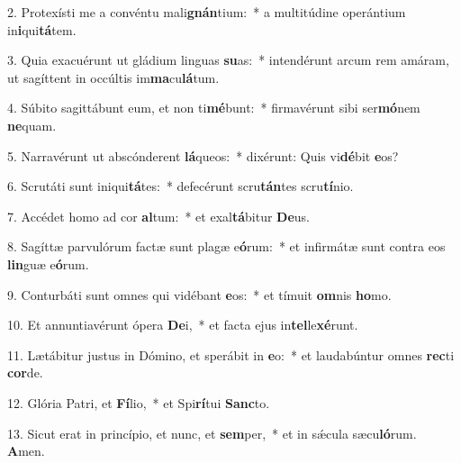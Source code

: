 2. Protexísti me a convéntu mali\textbf{gnán}tium:~*  a multitúdine operántium in\textbf{i}qui\textbf{tá}tem.\

3. Quia exacuérunt ut gládium linguas \textbf{su}as:~*  intendérunt arcum rem amáram, ut sagíttent in occúltis im\textbf{ma}cu\textbf{lá}tum.\

4. Súbito sagittábunt eum, et non ti\textbf{mé}bunt:~*  firmavérunt sibi ser\textbf{mó}nem \textbf{ne}quam.\

5. Narravérunt ut abscónderent \textbf{lá}queos:~*  dixérunt: Quis vi\textbf{dé}bit \textbf{e}os?\

6. Scrutáti sunt iniqui\textbf{tá}tes:~*  defecérunt scru\textbf{tán}tes scru\textbf{tí}nio.\

7. Accédet homo ad cor \textbf{al}tum:~*  et exal\textbf{tá}bitur \textbf{De}us.\

8. Sagíttæ parvulórum factæ sunt plagæ e\textbf{ó}rum:~*  et infirmátæ sunt contra eos \textbf{lin}guæ e\textbf{ó}rum.\

9. Conturbáti sunt omnes qui vidébant \textbf{e}os:~*  et tímuit \textbf{om}nis \textbf{ho}mo.\

10. Et annuntiavérunt ópera \textbf{De}i,~*  et facta ejus in\textbf{tel}le\textbf{xé}runt.\

11. Lætábitur justus in Dómino, et sperábit in \textbf{e}o:~*  et laudabúntur omnes \textbf{rec}ti \textbf{cor}de.\

12. Glória Patri, et \textbf{Fí}lio,~*  et Spi\textbf{rí}tui \textbf{Sanc}to.\

13. Sicut erat in princípio, et nunc, et \textbf{sem}per,~*  et in sǽcula sæcu\textbf{ló}rum. \textbf{A}men.\

